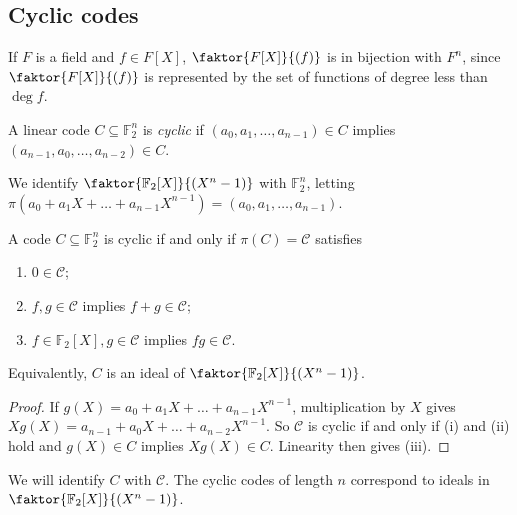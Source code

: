 \subsection{Cyclic codes}
If \( F \) is a field and \( f \in F[X] \), \( \faktor{F[X]}{(f)} \) is in bijection with \( F^n \), since \( \faktor{F[X]}{(f)} \) is represented by the set of functions of degree less than \( \deg f \).
\begin{definition}
    A linear code \( C \subseteq \mathbb F_2^n \) is \emph{cyclic} if \( (a_0, a_1, \dots, a_{n-1}) \in C \) implies \( (a_{n-1}, a_0, \dots, a_{n-2}) \in C \).
\end{definition}
We identify \( \faktor{\mathbb F_2[X]}{(X^n - 1)} \) with \( \mathbb F_2^n \), letting \( \pi(a_0 + a_1X + \dots + a_{n-1}X^{n-1}) = (a_0, a_1, \dots, a_{n-1}) \).
\begin{lemma}
    A code \( C \subseteq \mathbb F_2^n \) is cyclic if and only if \( \pi(C) = \mathcal C \) satisfies
    \begin{enumerate}
        \item \( 0 \in \mathcal C \);
        \item \( f, g \in \mathcal C \) implies \( f + g \in \mathcal C \);
        \item \( f \in \mathbb F_2[X], g \in \mathcal C \) implies \( fg \in \mathcal C \).
    \end{enumerate}
\end{lemma}
Equivalently, \( C \) is an ideal of \( \faktor{\mathbb F_2[X]}{(X^n - 1)} \).
\begin{proof}
    If \( g(X) = a_0 + a_1X + \dots + a_{n-1}X^{n-1} \), multiplication by \( X \) gives \( Xg(X) = a_{n-1} + a_0X + \dots + a_{n-2}X^{n-1} \).
    So \( \mathcal C \) is cyclic if and only if (i) and (ii) hold and \( g(X) \in C \) implies \( Xg(X) \in C \).
    Linearity then gives (iii).
\end{proof}
We will identify \( C \) with \( \mathcal C \).
The cyclic codes of length \( n \) correspond to ideals in \( \faktor{\mathbb F_2[X]}{(X^n - 1)} \).
